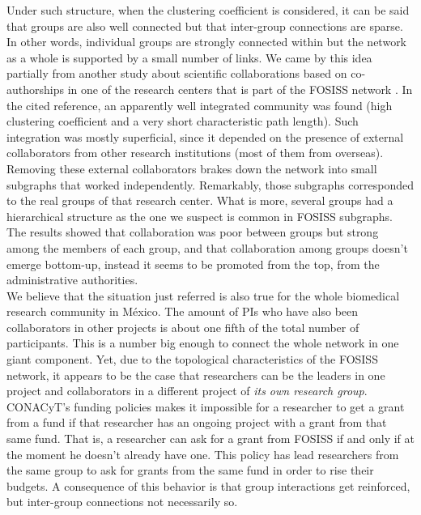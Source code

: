 \documentclass{bmcart}
\begin{document}
  Under such structure, when the clustering coefficient is
  considered, it can be said that groups are also well connected but
  that inter-group connections are sparse. In other words, individual
  groups are strongly connected within but the network as a whole is
  supported by a small number of links. We came by this idea partially
  from another study about scientific collaborations based on
  co-authorships in one of the research centers that is part of the
  FOSISS network \cite{HernandezLemus:2013}. In the cited reference, an
  apparently well integrated community was found (high clustering
  coefficient and a very short characteristic path length). Such
  integration was mostly superficial, since it depended on the
  presence of external collaborators from other research institutions
  (most of them from overseas).  Removing these external collaborators
  brakes down the network into small subgraphs that worked
  independently. Remarkably, those subgraphs corresponded to the real
  groups of that research center.  What is more, several groups had a
  hierarchical structure as the one we suspect is common in FOSISS
  subgraphs. The results showed that collaboration was poor between
  groups but strong among the members of each group, and that
  collaboration among groups doesn't emerge bottom-up, instead it
  seems to be promoted from the top, from the administrative
  authorities.\\

  We believe that the situation just referred is also
  true for the whole biomedical research community in M\'exico. The
  amount of PIs who have also been collaborators in other projects is
  about one fifth of the total number of participants.  This is a
  number big enough to connect the whole network in one giant
  component. Yet, due to the topological characteristics of the FOSISS
  network, it appears to be the case that researchers can be the
  leaders in one project and collaborators in a different project of
  \emph{its own research group}. CONACyT's funding policies makes it
  impossible for a researcher to get a grant from a fund if that
  researcher has an ongoing project with a grant from that same
  fund. That is, a researcher can ask for a grant from FOSISS if and
  only if at the moment he doesn't already have one.
  This policy has lead researchers from the same group to ask
  for grants from the same fund in order to rise their budgets. A
  consequence of this behavior is that group interactions get
  reinforced, but inter-group connections not necessarily so.\\
\end{document}
